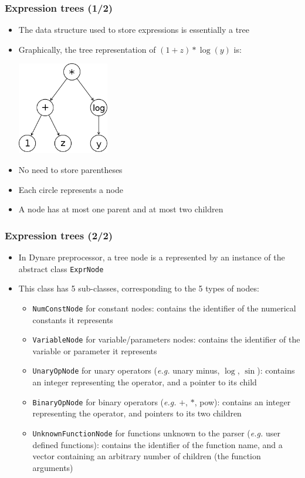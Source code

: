 \documentclass{beamer}
\begin{document}
\begin{frame}
  \frametitle{Expression trees (1/2)}
  \begin{itemize}
  \item The data structure used to store expressions is essentially a \alert{tree}
  \item Graphically, the tree representation of $(1+z)*\log(y)$ is:
    \begin{center}
      \includegraphics[width=4cm]{expr.png}
    \end{center}
  \item No need to store parentheses
  \item Each circle represents a \alert{node}
  \item A node has at most one parent and at most two children
  \end{itemize}
\end{frame}

\begin{frame}
  \frametitle{Expression trees (2/2)}
  \begin{itemize}
  \item In Dynare preprocessor, a tree node is a represented by an instance of the abstract class \texttt{ExprNode}
  \item This class has 5 sub-classes, corresponding to the 5 types of nodes:
    \begin{itemize}
    \item \texttt{NumConstNode} for constant nodes: contains the identifier of the numerical constants it represents
    \item \texttt{VariableNode} for variable/parameters nodes: contains the identifier of the variable or parameter it represents
    \item \texttt{UnaryOpNode} for unary operators (\textit{e.g.} unary minus, $\log$, $\sin$): contains an integer representing the operator, and a pointer to its child
    \item \texttt{BinaryOpNode} for binary operators (\textit{e.g.} $+$, $*$, pow): contains an integer representing the operator, and pointers to its two children
    \item \texttt{UnknownFunctionNode} for functions unknown to the parser (\textit{e.g.} user defined functions): contains the identifier of the function name, and a vector containing an arbitrary number of children (the function arguments)
    \end{itemize}
  \end{itemize}
\end{frame}
\end{document}
